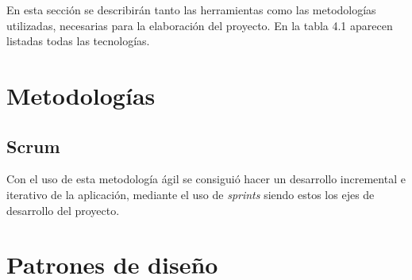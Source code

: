 
En esta sección se describirán tanto las herramientas como las metodologías utilizadas, necesarias para la elaboración del proyecto. En la tabla 4.1 aparecen listadas todas las tecnologías.






\section{Metodologías}
\subsection{Scrum}
Con el uso de esta metodología ágil se consiguió hacer un desarrollo incremental e iterativo de la aplicación, mediante el uso de \textit{sprints} siendo estos los ejes de desarrollo del proyecto.

\section{Patrones de diseño}
